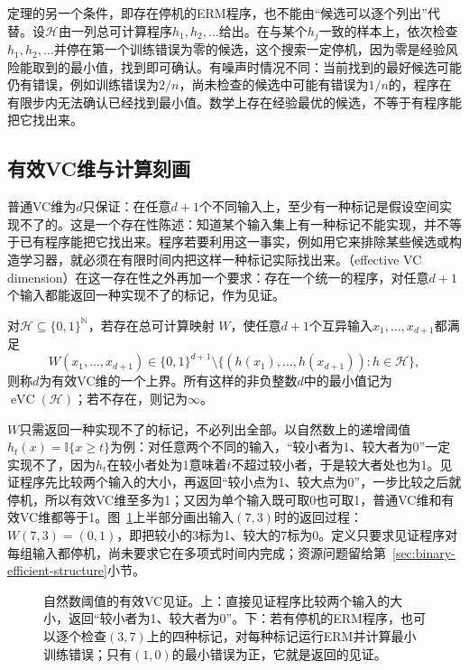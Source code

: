 定理的另一个条件，即存在停机的ERM程序，也不能由“候选可以逐个列出”代替。设$\mathcal H$由一列总可计算程序$h_1,h_2,\ldots$给出。在与某个$h_j$一致的样本上，依次检查$h_1,h_2,\ldots$并停在第一个训练错误为零的候选，这个搜索一定停机，因为零是经验风险能取到的最小值，找到即可确认。有噪声时情况不同：当前找到的最好候选可能仍有错误，例如训练错误为$2/n$，尚未检查的候选中可能有错误为$1/n$的，程序在有限步内无法确认已经找到最小值。数学上存在经验最优的候选，不等于有程序能把它找出来。

\subsection{有效VC维与计算刻画}
\label{sec:binary-effective-vc}

普通VC维为$d$只保证：在任意$d+1$个不同输入上，至少有一种标记是假设空间实现不了的。这是一个存在性陈述：知道某个输入集上有一种标记不能实现，并不等于已有程序能把它找出来。程序若要利用这一事实，例如用它来排除某些候选或构造学习器，就必须在有限时间内把这样一种标记实际找出来。（effective VC dimension）在这一存在性之外再加一个要求：存在一个统一的程序，对任意$d+1$个输入都能返回一种实现不了的标记，作为见证。

\begin{definition}[有效VC维]
\label{def:effective-vc-dimension}
对$\mathcal H\subseteq\{0,1\}^{\mathbb N}$，若存在总可计算映射
$W$，使任意$d+1$个互异输入$x_1,\ldots,x_{d+1}$都满足
\[
 W(x_1,\ldots,x_{d+1})\in\{0,1\}^{d+1}
 \setminus\{(h(x_1),\ldots,h(x_{d+1})):h\in\mathcal H\},
\]
则称$d$为有效VC维的一个上界。所有这样的非负整数$d$中的最小值记为
$\operatorname{eVC}(\mathcal H)$；若不存在，则记为$\infty$。
\end{definition}

$W$只需返回一种实现不了的标记，不必列出全部。以自然数上的递增阈值$h_t(x)=\mathbb I\{x\geq t\}$为例：对任意两个不同的输入，“较小者为1、较大者为0”一定实现不了，因为$h_t$在较小者处为1意味着$t$不超过较小者，于是较大者处也为1。见证程序先比较两个输入的大小，再返回“较小点为1、较大点为0”，一步比较之后就停机，所以有效VC维至多为1；又因为单个输入既可取0也可取1，普通VC维和有效VC维都等于1。图~\ref{fig:lt5-effective-vc-witness}上半部分画出输入$(7,3)$时的返回过程：$W(7,3)=(0,1)$，即把较小的3标为1、较大的7标为0。定义只要求见证程序对每组输入都停机，尚未要求它在多项式时间内完成；资源问题留给第~\ref{sec:binary-efficient-structure}小节。

\begin{figure}[htbp]
  \centering
  
  \caption{自然数阈值的有效VC见证。上：直接见证程序比较两个输入的大小，返回“较小者为1、较大者为0”。下：若有停机的ERM程序，也可以逐个检查$(3,7)$上的四种标记，对每种标记运行ERM并计算最小训练错误；只有$(1,0)$的最小错误为正，它就是返回的见证。}
  \label{fig:lt5-effective-vc-witness}
\end{figure}

